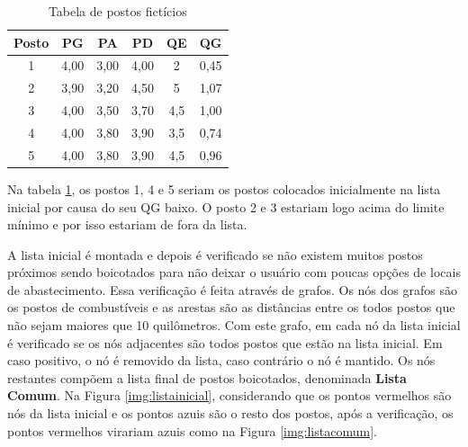 \begin{table}[H]
\centering
\caption{Tabela de postos fictícios}
\label{tab:exemplo}
\begin{tabular}{|c|c|c|c|c|c|}\hline
\textbf{Posto} & \textbf{PG}   & \textbf{PA}   & \textbf{PD}   & \textbf{QE}  & \textbf{QG}   \\
\hline
1     & 4,00 & 3,00 & 4,00 & 2   & 0,45 \\ \hline
2     & 3,90 & 3,20 & 4,50 & 5   & 1,07 \\ \hline
3     & 4,00 & 3,50 & 3,70 & 4,5 & 1,00 \\ \hline
4     & 4,00 & 3,80 & 3,90 & 3,5 & 0,74 \\ \hline
5     & 4,00 & 3,80 & 3,90 & 4,5 & 0,96 \\ \hline
\end{tabular}
\end{table}

Na tabela \ref{tab:exemplo}, os postos 1, 4 e 5 seriam os postos colocados inicialmente na lista inicial por causa do seu QG baixo. O posto 2 e 3 estariam logo acima do limite mínimo e por isso estariam de fora da lista.

A lista inicial é montada e depois é verificado se não existem muitos postos próximos sendo boicotados para não deixar o usuário com poucas opções de locais de abastecimento. Essa verificação é feita através de grafos. Os nós dos grafos são os postos de combustíveis e as arestas são as distâncias entre os todos postos que não sejam maiores que 10 quilômetros. Com este grafo, em cada nó da lista inicial é verificado se os nós adjacentes são todos postos que estão na lista inicial. Em caso positivo, o nó é removido da lista, caso contrário o nó é mantido. Os nós restantes compõem a lista final de postos boicotados, denominada \textbf{Lista Comum}. Na Figura \ref{img:listainicial}, considerando que os pontos vermelhos são nós da lista inicial e os pontos azuis são o resto dos postos, após a verificação, os pontos vermelhos virariam azuis como na Figura \ref{img:listacomum}.

